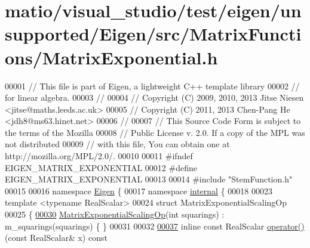 \hypertarget{matio_2visual__studio_2test_2eigen_2unsupported_2_eigen_2src_2_matrix_functions_2_matrix_exponential_8h_source}{}\section{matio/visual\+\_\+studio/test/eigen/unsupported/\+Eigen/src/\+Matrix\+Functions/\+Matrix\+Exponential.h}
\label{matio_2visual__studio_2test_2eigen_2unsupported_2_eigen_2src_2_matrix_functions_2_matrix_exponential_8h_source}

\begin{DoxyCode}
00001 \textcolor{comment}{// This file is part of Eigen, a lightweight C++ template library}
00002 \textcolor{comment}{// for linear algebra.}
00003 \textcolor{comment}{//}
00004 \textcolor{comment}{// Copyright (C) 2009, 2010, 2013 Jitse Niesen <jitse@maths.leeds.ac.uk>}
00005 \textcolor{comment}{// Copyright (C) 2011, 2013 Chen-Pang He <jdh8@ms63.hinet.net>}
00006 \textcolor{comment}{//}
00007 \textcolor{comment}{// This Source Code Form is subject to the terms of the Mozilla}
00008 \textcolor{comment}{// Public License v. 2.0. If a copy of the MPL was not distributed}
00009 \textcolor{comment}{// with this file, You can obtain one at http://mozilla.org/MPL/2.0/.}
00010 
00011 \textcolor{preprocessor}{#ifndef EIGEN\_MATRIX\_EXPONENTIAL}
00012 \textcolor{preprocessor}{#define EIGEN\_MATRIX\_EXPONENTIAL}
00013 
00014 \textcolor{preprocessor}{#include "StemFunction.h"}
00015 
00016 \textcolor{keyword}{namespace }\hyperlink{namespace_eigen}{Eigen} \{
00017 \textcolor{keyword}{namespace }\hyperlink{namespaceinternal}{internal} \{
00018 
00023 \textcolor{keyword}{template} <\textcolor{keyword}{typename} RealScalar>
00024 \textcolor{keyword}{struct }MatrixExponentialScalingOp
00025 \{
\hyperlink{struct_eigen_1_1internal_1_1_matrix_exponential_scaling_op_afb0f3ee7d324e315d1e1233f70110438}{00030}   \hyperlink{struct_eigen_1_1internal_1_1_matrix_exponential_scaling_op_afb0f3ee7d324e315d1e1233f70110438}{MatrixExponentialScalingOp}(\textcolor{keywordtype}{int} squarings) : m\_squarings(squarings) \{ \}
00031 
00032 
\hyperlink{struct_eigen_1_1internal_1_1_matrix_exponential_scaling_op_ad4c95fe9fcbf59981c2a5a0a4e42041d}{00037}   \textcolor{keyword}{inline} \textcolor{keyword}{const} RealScalar \hyperlink{struct_eigen_1_1internal_1_1_matrix_exponential_scaling_op_ad4c95fe9fcbf59981c2a5a0a4e42041d}{operator() }(\textcolor{keyword}{const} RealScalar& x)\textcolor{keyword}{ const}

\end{DoxyCode}
